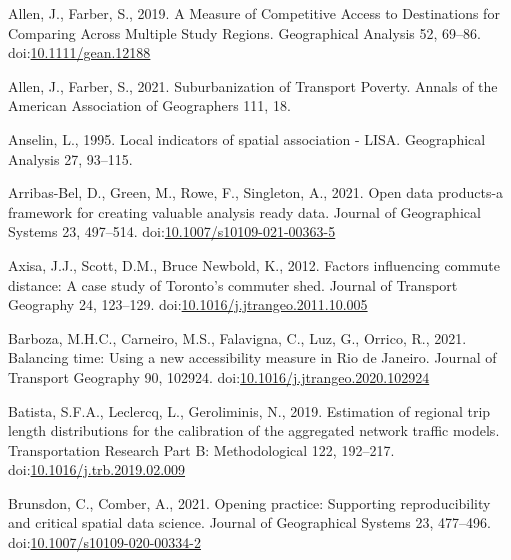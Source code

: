 \documentclass[]{elsarticle} %
\newlength{\cslhangindent}
\newlength{\cslentryspacingunit} %
\newenvironment{CSLReferences}[2] %
 {%
  \setlength{\parindent}{0pt}
  \ifodd #1
  \let\oldpar\par
  \def\par{\hangindent=\cslhangindent\oldpar}
  \fi
  \setlength{\parskip}{#2\cslentryspacingunit}
 }%
 {}
\begin{document}
\hypertarget{refs}{}
\begin{CSLReferences}{1}{0}
\leavevmode{}%
Allen, J., Farber, S., 2019. A Measure of Competitive Access to
Destinations for Comparing Across Multiple Study Regions. Geographical
Analysis 52, 69--86.
doi:\href{https://doi.org/10.1111/gean.12188}{10.1111/gean.12188}

\leavevmode{}%
Allen, J., Farber, S., 2021. Suburbanization of {Transport} {Poverty}.
Annals of the American Association of Geographers 111, 18.

\leavevmode{}%
Anselin, L., 1995. Local indicators of spatial association - LISA.
Geographical Analysis 27, 93--115.

\leavevmode{}%
Arribas-Bel, D., Green, M., Rowe, F., Singleton, A., 2021. Open data
products-a framework for creating valuable analysis ready data. Journal
of Geographical Systems 23, 497--514.
doi:\href{https://doi.org/10.1007/s10109-021-00363-5}{10.1007/s10109-021-00363-5}

\leavevmode{}%
Axisa, J.J., Scott, D.M., Bruce Newbold, K., 2012. Factors influencing
commute distance: A case study of {Toronto}'s commuter shed. Journal of
Transport Geography 24, 123--129.
doi:\href{https://doi.org/10.1016/j.jtrangeo.2011.10.005}{10.1016/j.jtrangeo.2011.10.005}

\leavevmode{}%
Barboza, M.H.C., Carneiro, M.S., Falavigna, C., Luz, G., Orrico, R.,
2021. Balancing time: {Using} a new accessibility measure in {Rio} de
{Janeiro}. Journal of Transport Geography 90, 102924.
doi:\href{https://doi.org/10.1016/j.jtrangeo.2020.102924}{10.1016/j.jtrangeo.2020.102924}

\leavevmode{}%
Batista, S.F.A., Leclercq, L., Geroliminis, N., 2019. Estimation of
regional trip length distributions for the calibration of the aggregated
network traffic models. Transportation Research Part B: Methodological
122, 192--217.
doi:\href{https://doi.org/10.1016/j.trb.2019.02.009}{10.1016/j.trb.2019.02.009}

\leavevmode{}%
Brunsdon, C., Comber, A., 2021. Opening practice: Supporting
reproducibility and critical spatial data science. Journal of
Geographical Systems 23, 477--496.
doi:\href{https://doi.org/10.1007/s10109-020-00334-2}{10.1007/s10109-020-00334-2}


\end{CSLReferences}
\end{document}
